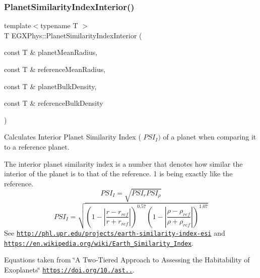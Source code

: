 \subsubsection{\texorpdfstring{Planet\+Similarity\+Index\+Interior()}{PlanetSimilarityIndexInterior()}}
{\footnotesize\ttfamily template$<$typename T $>$ \\
T E\+G\+X\+Phys\+::\+Planet\+Similarity\+Index\+Interior (\begin{DoxyParamCaption}\item[{const T \&}]{planet\+Mean\+Radius,  }\item[{const T \&}]{reference\+Mean\+Radius,  }\item[{const T \&}]{planet\+Bulk\+Density,  }\item[{const T \&}]{reference\+Bulk\+Density }\end{DoxyParamCaption})}



Calculates Interior Planet Similarity Index ( $PSI_I)$ of a planet when comparing it to a reference planet. 

The interior planet similarity index is a number that denotes how similar the interior of the planet is to that of the reference. 1 is being exactly like the reference. \[PSI_I=\sqrt{PSI_r PSI_\rho}\] \[PSI_I=\sqrt{\left ( 1 - \left | \frac{r-r_{ref}}{r+r_{ref}} \right | \right )^{0.57} \left ( 1 - \left | \frac{\rho-\rho_{ref}}{\rho+\rho_{ref}} \right | \right )^{1.07}}\] See \href{http://phl.upr.edu/projects/earth-similarity-index-esi}{\tt http\+://phl.\+upr.\+edu/projects/earth-\/similarity-\/index-\/esi} and \href{https://en.wikipedia.org/wiki/Earth_Similarity_Index}{\tt https\+://en.\+wikipedia.\+org/wiki/\+Earth\+\_\+\+Similarity\+\_\+\+Index}.

Equations taken from \char`\"{}\+A Two-\/\+Tiered Approach to Assessing the Habitability of Exoplanets\char`\"{} \href{https://doi.org/10.1089/ast.2010.0592}{\tt https\+://doi.\+org/10./ast..}.


